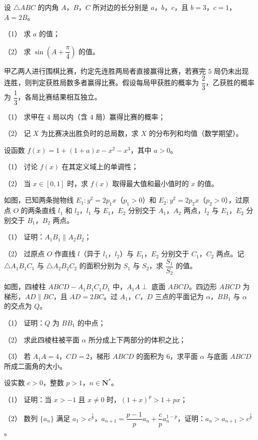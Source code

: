 \begin{question}
设 $\triangle ABC$ 的内角 $A$，$B$，$C$ 所对边的长分别是 $a$，$b$，$c$，且 $b=3$，$c=1$，$A=2B$。

（1） 求 $a$ 的值；

（2） 求 $\sin\left(A+\dfrac\pi4\right)$ 的值。

\end{question}
\begin{question}
甲乙两人进行围棋比赛，约定先连胜两局者直接赢得比赛，若赛完 $5$ 局仍未出现连胜，则判定获胜局数多者赢得比赛。假设每局甲获胜的概率为 $\dfrac23$，乙获胜的概率为 $\dfrac13$，各局比赛结果相互独立。

（1） 求甲在 $4$ 局以内（含 $4$ 局）赢得比赛的概率；

（2） 记 $X$ 为比赛决出胜负时的总局数，求 $X$ 的分布列和均值（数学期望）。

\end{question}
\begin{question}
设函数 $f(x)=1+(1+a)x-x^2-x^3$，其中 $a>0$。

（1） 讨论 $f(x)$ 在其定义域上的单调性；

（2） 当 $x\in[0,1]$ 时，求 $f(x)$ 取得最大值和最小值时的 $x$ 的值。

\Needspace{0.4\textheight}
\end{question}
\begin{question}
如图，已知两条抛物线 $E_1:y^2=2p_1x$（$p_1>0$）和 $E_2:y^2=2p_2x$（$p_2>0$），过原点 $O$ 的两条直线 $l_1$ 和 $l_2$，$l_1$ 与 $E_1$，$E_2$ 分别交于 $A_1$，$A_2$ 两点，$l_2$ 与 $E_1$，$E_2$ 分别交于 $B_1$，$B_2$ 两点。
\nopagebreak[4]
\begin{center}\end{center}
\nopagebreak[4]
（1） 证明：$A_1B_1\parallel A_2B_2$；

（2） 过原点 $O$ 作直线 $l$（异于 $l_1$，$l_2$）与 $E_1$，$E_2$ 分别交于 $C_1$，$C_2$ 两点。记 $\triangle A_1B_1C_1$ 与 $\triangle A_2B_2C_2$ 的面积分别为 $S_1$ 与 $S_2$，求 $\dfrac{S_1}{S_2}$ 的值。

\Needspace{0.4\textheight}
\end{question}
\begin{question}
如图，四棱柱 $ABCD-A_1B_1C_1D_1$ 中，$A_1A\perp$ 底面 $ABCD$。四边形 $ABCD$ 为梯形，$AD\parallel BC$，且 $AD=2BC$。过 $A_1$，$C$，$D$ 三点的平面记为 $\alpha$，$BB_1$ 与 $\alpha$ 的交点为 $Q$。
\nopagebreak[4]
\begin{center}\end{center}
\nopagebreak[4]
（1） 证明：$Q$ 为 $BB_1$ 的中点；

（2） 求此四棱柱被平面 $\alpha$ 所分成上下两部分的体积之比；

（3） 若 $A_1A=4$，$CD=2$，梯形 $ABCD$ 的面积为 $6$，求平面 $\alpha$ 与底面 $ABCD$ 所成二面角的大小。

\end{question}
\begin{question}
设实数 $c>0$，整数 $p>1$，$n\in\mathbf N^*$。

（1） 证明：当 $x>-1$ 且 $x\neq0$ 时，$(1+x)^p>1+px$；

（2） 数列 $\{a_n\}$ 满足 $a_1>c^{\frac1p}$，$a_{n+1}=\dfrac{p-1}p a_n+\dfrac cp a_n^{1-p}$，证明：$a_n>a_{n+1}>c^{\frac1p}$。

\end{question}